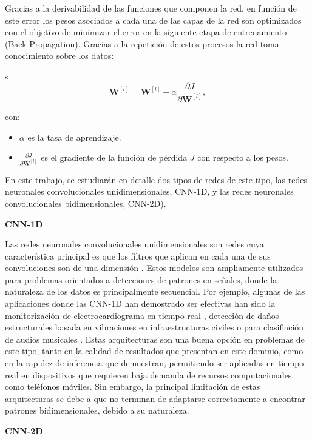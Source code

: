 \documentclass{uathesis-es}
\begin{document}
Gracias a la derivabilidad de las funciones que componen la red, en función de este error los pesos asociados a cada una de las capas de la red son optimizados con el objetivo de minimizar el error en la siguiente etapa de entrenamiento (Back Propagation). Gracias a la repetición de estos procesos la red toma conocimiento sobre los datos:

s
\[
    \mathbf{W}^{[l]} = \mathbf{W}^{[l]} - \alpha \frac{\partial J}{\partial \mathbf{W}^{[l]}},
\]

con:
\begin{itemize}
    \item \(\alpha\) es la tasa de aprendizaje.
    \item \(\frac{\partial J}{\partial \mathbf{W}^{[l]}}\) es el gradiente de la función de pérdida \(J\) con respecto a los pesos.
\end{itemize}

En este trabajo, se estudiarán en detalle dos tipos de redes de este tipo, las redes neuronales convolucionales unidimensionales, CNN-1D, y las redes neuronales convolucionales bidimensionales, CNN-2D).

\textbf{CNN-1D}

Las redes neuronales convolucionales unidimensionales son redes cuya característica principal es que los filtros que aplican en cada una de sus convoluciones son de una dimensión \cite{CNN1D}. Estos modelos son ampliamente utilizados para problemas orientados a detecciones de patrones en señales, donde la naturaleza de los datos es principalmente secuencial. Por ejemplo, algunas de las aplicaciones donde las CNN-1D han demostrado ser efectivas han sido la monitorización de electrocardiograma en tiempo real \cite{Kiranyaz2017tt}, detección de daños estructurales basada en vibraciones en infraestructuras civiles \cite{khodabandehlou2019vibration} o para clasifiación de audios musicales \cite{allamy20211d}. Estas arquitecturas son una buena opción en problemas de este tipo, tanto en la calidad de resultados que presentan en este dominio, como en la rapidez de inferencia que demuestran, permitiendo ser aplicadas en tiempo real en dispositivos que requieren baja demanda de recursos computacionales, como teléfonos móviles. Sin embargo, la principal limitación de estas arquitecturas se debe a que no terminan de adaptarse correctamente a encontrar patrones bidimensionales, debido a su naturaleza.

\textbf{CNN-2D}
\end{document}
